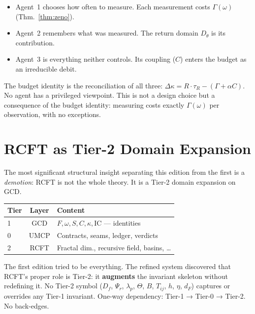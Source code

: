 \documentclass[
  aps,
  prd,
  preprint,
  superscriptaddress,
  nofootinbib,
  floatfix,
  longbibliography
]{revtex4-2}
\newcommand{\tR}{\tau_{\!R}}
\newcommand{\Gam}{\Gamma}
\newcommand{\IC}{\mathrm{IC}}
\newcommand{\Fid}{F}
\newcommand{\Drft}{\omega}
\newcommand{\Ent}{S}
\newcommand{\Curv}{C}
\newcommand{\Logint}{\kappa}
\newcommand{\Psirec}{\Psi_{r}}
\newcommand{\dFisher}{d_{\!F}}
\begin{document}
\begin{itemize}[nosep,leftmargin=*]
  \item Agent~1 chooses how often to measure.
    Each measurement costs $\Gam(\Drft)$ (Thm.~\ref{thm:zeno}).
  \item Agent~2 remembers what was measured.
    The return domain $D_\theta$ is its contribution.
  \item Agent~3 is everything neither controls.
    Its coupling ($\Curv$) enters the budget as an
    irreducible debit.
\end{itemize}

The budget identity is the reconciliation of all three:
$\Delta\Logint = R \cdot \tR - (\Gam + \alpha\Curv)$.
No agent has a privileged viewpoint.
This is not a design choice but a consequence of the
budget identity: measuring costs exactly $\Gam(\Drft)$
per observation, with no exceptions.

\section{RCFT as Tier-2 Domain Expansion}\label{sec:rcft}

The most significant structural insight
separating this edition from the first is a \emph{demotion}:
RCFT is not the whole theory. It is a Tier-2 domain
expansion on GCD.

\begin{center}
\begin{tabular}{@{}lcl@{}}
\toprule
\textbf{Tier} & \textbf{Layer} & \textbf{Content} \\
\midrule
1 & GCD & $\Fid, \Drft, \Ent, \Curv, \Logint, \IC$ — identities \\
0 & UMCP & Contracts, seams, ledger, verdicts \\
2 & RCFT & Fractal dim., recursive field, basins, \ldots \\
\bottomrule
\end{tabular}
\end{center}

The first edition tried to be everything.
The refined system discovered that RCFT's proper role
is Tier-2: it \textbf{augments} the invariant skeleton
without redefining it.
No Tier-2 symbol ($D_f$, $\Psirec$, $\lambda_p$,
$\Theta$, $B$, $T_{ij}$, $h$, $\eta$, $\dFisher$)
captures or overrides any Tier-1 invariant.
One-way dependency: Tier-1 → Tier-0 → Tier-2.
No back-edges.
\end{document}

